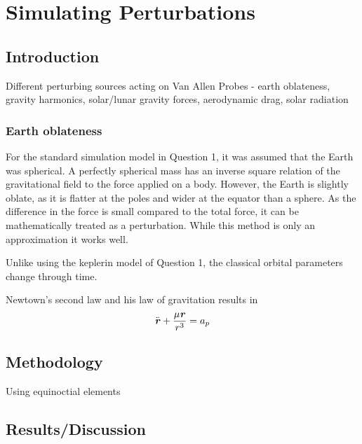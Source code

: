 \documentclass[Space3_Assign1.tex]{subfiles}
\begin{document}
\section{Simulating Perturbations}

\subsection{Introduction}
Different perturbing sources acting on Van Allen Probes - earth oblateness, gravity harmonics, solar/lunar gravity forces, aerodynamic drag, solar radiation\\

\subsubsection{Earth oblateness}
For the standard simulation model in Question 1, it was assumed that the Earth was spherical. A perfectly spherical mass has an inverse square relation of the gravitational field to the force applied on a body. However, the Earth is slightly oblate, as it is flatter at the poles and wider at the equator than a sphere. As the difference in the force is small compared to the total force, it can be mathematically treated as a perturbation. While this method is only an approximation it works well.

Unlike using the keplerin model of Question 1, the classical orbital parameters change through time.


Newtown's second law and his law of gravitation results in 
\begin{eqnarray}
\ddot{\textbf{\textit{r}}}+\frac{\mu\textbf{\textit{r}}}{r^3} = a_p
\end{eqnarray}

\subsection{Methodology}
Using equinoctial elements



\subsection{Results/Discussion}
\end{document}
